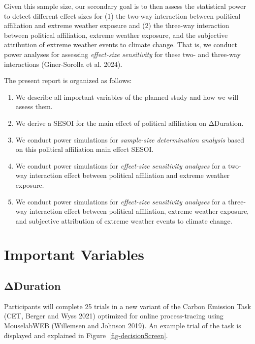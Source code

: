 \documentclass[
  letterpaper,
  DIV=11,
  numbers=noendperiod]{scrartcl}
\begin{document}
Given this sample size, our secondary goal is to then assess the
statistical power to detect different effect sizes for (1) the two-way
interaction between political affiliation and extreme weather exposure
and (2) the three-way interaction between political affiliation, extreme
weather exposure, and the subjective attribution of extreme weather
events to climate change. That is, we conduct power analyses for
assessing \emph{effect-size sensitivity} for these two- and three-way
interactions (Giner-Sorolla et al. 2024).

The present report is organized as follows:

\begin{enumerate}
\def\labelenumi{\arabic{enumi}.}
\item
  We describe all important variables of the planned study and how we
  will assess them.
\item
  We derive a SESOI for the main effect of political affiliation on
  ΔDuration.
\item
  We conduct power simulations for \emph{sample-size determination
  analysis} based on this political affiliation main effect SESOI.
\item
  We conduct power simulations for \emph{effect-size sensitivity
  analyses} for a two-way interaction effect between political
  affiliation and extreme weather exposure.
\item
  We conduct power simulations for \emph{effect-size sensitivity
  analyses} for a three-way interaction effect between political
  affiliation, extreme weather exposure, and subjective attribution of
  extreme weather events to climate change.
\end{enumerate}

\section{Important Variables}\label{important-variables}

\subsection{ΔDuration}\label{ux3b4duration}

Participants will complete 25 trials in a new variant of the Carbon
Emission Task (CET, Berger and Wyss 2021) optimized for online
process-tracing using MouselabWEB (Willemsen and Johnson 2019). An
example trial of the task is displayed and explained in
Figure~\ref{fig-decisionScreen}.
\end{document}
